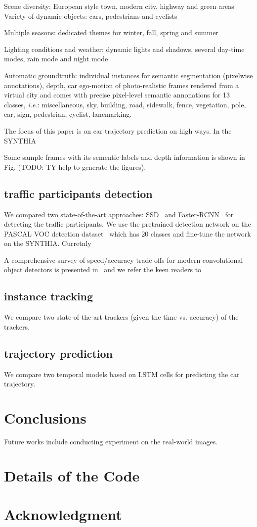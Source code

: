 \documentclass[10pt,twocolumn,letterpaper]{article}
\begin{document}
Scene diversity: European style town, modern city, highway and green areas
Variety of dynamic objects: cars, pedestrians and cyclists

Multiple seasons: dedicated themes for winter, fall, spring and summer

Lighting conditions and weather: dynamic lights and shadows, several day-time modes, rain mode and night mode


Automatic groundtruth: individual instances for semantic segmentation (pixelwise annotations), depth, car ego-motion
 of photo-realistic frames rendered from a virtual city and comes with precise pixel-level semantic annonations for 13 classes, \emph{i.e.}: miscellaneous, sky, building, road, sidewalk, fence, vegetation, pole, car, sign, pedestrian, cyclist, lanemarking. 



The focus of this paper is on car trajectory prediction on high ways. In the SYNTHIA

Some sample frames with its sementic labels and depth information is shown in Fig. (TODO: TY help to generate the figures).
\subsection{traffic participants detection}

We compared two state-of-the-art approaches: SSD~\cite{liu2016ssd} and Faster-RCNN~\cite{ren2015faster} for detecting the traffic participants.
We use the pretrained detection network on the PASCAL VOC detection dataset~\cite{everingham2015pascal} which has 20 classes and fine-tune the network on the SYNTHIA. Curretnly

A comprehensive survey of speed/accuracy trade-offs for modern convolutional object detectors is presented in~\cite{huang2017speed} and we refer the keen readers to


\subsection{instance tracking}

We compare two state-of-the-art trackers (given the time vs. accuracy) of the trackers.

\subsection{trajectory prediction}

We compare two temporal models based on LSTM cells for predicting the car trajectory.

\section{Conclusions}

Future works include conducting experiment on the real-world images.

\section*{Details of the Code}


\section*{Acknowledgment}

{\small


}
\end{document}
